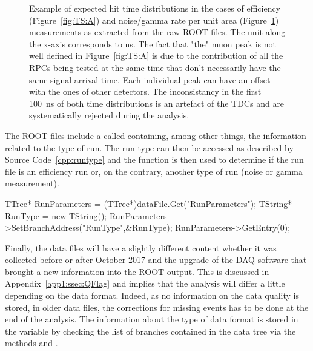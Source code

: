 \begin{figure}[H]
\begin{subfigure}{0.5\linewidth}
			\caption{\label{fig:TS:B}}
		\end{subfigure}
		\caption{\label{fig:TS} Example of expected hit time distributions in the cases of efficiency (Figure~\ref{fig:TS:A}) and noise/gamma rate per unit area (Figure~\ref{fig:TS:B}) measurements as extracted from the raw ROOT files. The unit along the x-axis corresponds to \si{ns}. The fact that "the" muon peak is not well defined in Figure~\ref{fig:TS:A} is due to the contribution of all the RPCs being tested at the same time that don't necessarily have the same signal arrival time. Each individual peak can have an offset with the ones of other detectors. The inconsistancy in the first \SI{100}{ns} of both time distributions is an artefact of the TDCs and are systematically rejected during the analysis.}
	\end{figure}
	
	The ROOT files include a  called  containing, among other things, the information related to the type of run. The run type can then be accessed as described by Source Code~\ref{cpp:runtype} and the function  is then used to determine if the run file is an efficiency run or, on the contrary, another type of run (noise or gamma measurement).\\
	
	\begin{code}
	\begin{cppcode}
TTree* RunParameters = (TTree*)dataFile.Get("RunParameters");
TString* RunType = new TString();
RunParameters->SetBranchAddress("RunType",&RunType);
RunParameters->GetEntry(0);
	\end{cppcode}
	\label{cpp:runtype}
	\vspace{5mm}
	\end{code}
	
	Finally, the data files will have a slightly different content whether it was collected before or after October 2017 and the upgrade of the DAQ software that brought a new information into the ROOT output. This is discussed in Appendix~\ref{app1:ssec:QFlag} and implies that the analysis will differ a little depending on the data format. Indeed, as no information on the data quality is stored, in older data files, the corrections for missing events has to be done at the end of the analysis. The information about the type of data format is stored in the variable  by checking the list of branches contained in the data tree via the methods  and .
	
